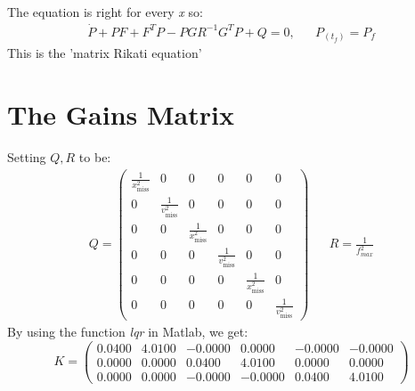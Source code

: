 \documentclass[11pt, a4paper]{article}
\begin{document}
The equation is right for every \emph{x} so:
\begin{equation}
    \begin{matrix}
        \dot{P}+PF+F^TP-PGR^{-1}G^TP+Q=0, && P_{\left(t_f\right)}=P_f
    \end{matrix}
\end{equation}
This is the 'matrix Rikati equation'
\newpage

\section{The Gains Matrix}
Setting $Q,R$ to be:
\begin{equation}
    \begin{matrix}
        Q=\begin{pmatrix}
            \displaystyle\frac{1}{x_{\mathrm{miss}}^2} & 0 & 0 & 0 & 0 & 0 \\
            0 & \displaystyle\frac{1}{v_{\mathrm{miss}}^2} & 0 & 0 & 0 & 0 \\
            0 & 0 & \displaystyle\frac{1}{x_{\mathrm{miss}}^2} & 0 & 0 & 0 \\
            0 & 0 & 0 & \displaystyle\frac{1}{v_{\mathrm{miss}}^2} & 0 & 0 \\
            0 & 0 & 0 & 0 & \displaystyle\frac{1}{x_{\mathrm{miss}}^2} & 0 \\
            0 & 0 & 0 & 0 & 0 & \displaystyle\frac{1}{v_{\mathrm{miss}}^2}
        \end{pmatrix} && \displaystyle R=\frac{1}{f_{max}^2}
    \end{matrix}
\end{equation}
By using the function \emph{lqr} in Matlab, we get:
\begin{equation}
    K = \begin{pmatrix}
        0.0400&4.0100&-0.0000&0.0000&-0.0000&-0.0000\\
        0.0000&0.0000&0.0400&4.0100&0.0000&0.0000\\
        0.0000&0.0000&-0.0000&-0.0000&0.0400&4.0100
    \end{pmatrix}
\end{equation}
\end{document}
